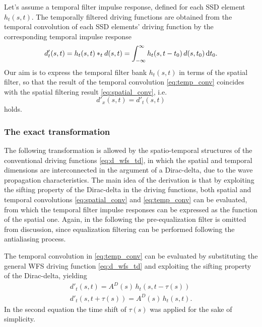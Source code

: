\documentclass[conference]{IEEEtran}
\begin{document}
Let's assume a temporal filter impulse response, defined for each SSD element $h_t(s,t)$.
The temporally filtered driving functions are obtained from the temporal convolution of each SSD elements' driving function by the corresponding temporal impulse response
\begin{equation}
    d'_t(s,t) = h_t(s,t) \ast_t d(s,t) = \int_{-\infty}^{\infty} h_t(s,t-t_0) \, d(s,t_0) \, \td t_0.
    \label{eq:temp_conv}
\end{equation}
Our aim is to express the temporal filter bank $h_t(s,t)$ in terms of the spatial filter, so that the result of the temporal convolution \eqref{eq:temp_conv} coincides with the spatial filtering result \eqref{eq:spatial_conv}, i.e.
\begin{equation}
    d'_x(s,t) = d'_t(s,t)
\end{equation}
holds.

\subsubsection{The exact transformation}
The following transformation is allowed by the spatio-temporal structures of the conventional driving functions \eqref{eq:d_wfs_td}, in which the spatial and temporal dimensions are interconnected in the argument of a Dirac-delta, due to the wave propagation characteristics.
The main idea of the derivation is that by exploiting the sifting property of the Dirac-delta in the driving functions, both spatial and temporal convolutions \eqref{eq:spatial_conv} and \eqref{eq:temp_conv} can be evaluated, from which the temporal filter impulse responses can be expressed as the function of the spatial one.
Again, in the following the pre-equalization filter is omitted from discussion, since equalization filtering can be performed following the antialiasing process.

The temporal convolution in \eqref{eq:temp_conv} can be evaluated by substituting the general WFS driving function \eqref{eq:d_wfs_td} and exploiting the sifting property of the Dirac-delta, yielding
\begin{align}
    d'_t(s,t) = A^D(s) \, h_t \!\left(s,t- \tau(s) \right) \\
    d'_t(s,t + \tau(s) ) = A^D(s) \, h_t \!\left(s,t\right).
    \label{eq:temp_conv_eval}
\end{align}
In the second equation the time shift of $\tau(s)$ was applied for the sake of simplicity.
\end{document}
